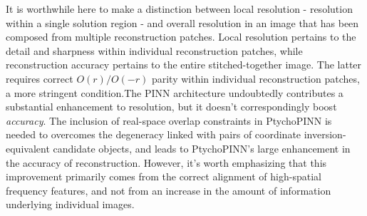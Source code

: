 \documentclass[sn-mathphys]{sn-jnl}%
\theoremstyle{thmstyleone}%
\theoremstyle{thmstyletwo}%
\theoremstyle{thmstylethree}%
\begin{document}


It is worthwhile here to make a distinction between local resolution - resolution within a single solution region - and overall resolution in an image that has been composed from multiple reconstruction patches. Local resolution pertains to the detail and sharpness within individual reconstruction patches, while reconstruction accuracy pertains to the entire stitched-together image. The latter requires correct $O(r) / O(-r)$ parity within individual reconstruction patches, a more stringent condition.The PINN architecture undoubtedly contributes a substantial enhancement to resolution, but it doesn't correspondingly boost \emph{accuracy}. The inclusion of real-space overlap constraints in PtychoPINN is needed to overcomes the degeneracy linked with pairs of coordinate inversion-equivalent candidate objects, and leads to PtychoPINN's large enhancement in the accuracy of reconstruction.  However, it's worth emphasizing that this improvement primarily comes from the correct alignment of high-spatial frequency features, and not from an increase in the amount of information underlying individual images.%


\end{document}
